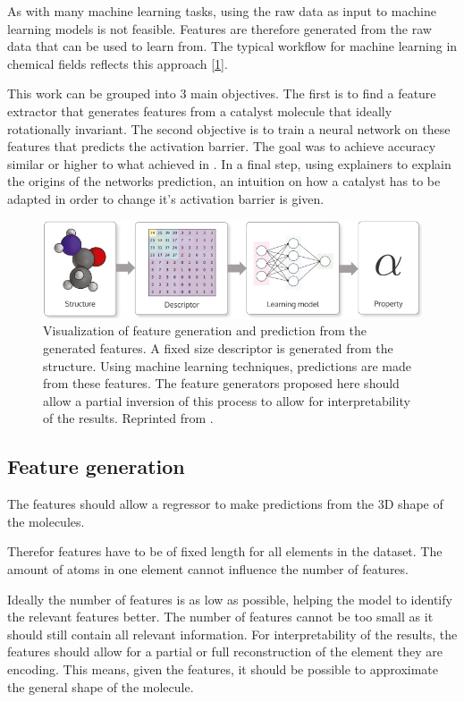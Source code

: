 As with many machine learning tasks, using the raw data as input to machine learning models is not feasible.
Features are therefore generated from the raw data that can be used to learn from.
The typical workflow for machine learning in chemical fields reflects this approach [\ref{fig:feature-process}].

This work can be grouped into 3 main objectives. 
The first is to find a feature extractor that generates features from a catalyst molecule that ideally rotationally invariant.
The second objective is to train a neural network on these features that predicts the activation barrier.
The goal was to achieve accuracy similar or higher to what \citeauthor{friederich_dos} achieved in \cite{friederich_dos}.
In a final step, using explainers to explain the origins of the networks prediction, an intuition on how a catalyst has 
to be adapted in order to change it's activation barrier is given.


\begin{figure}
  \centering
  \includegraphics[width=12cm]{figures/introduction/chem-descriptor.jpg}
  \caption[Machine learning in chemistry]{Visualization of feature generation and prediction from the generated features. 
  A fixed size descriptor is generated from the structure. Using machine learning techniques, 
  predictions are made from these features.
  The feature generators proposed here should allow a partial inversion of this process to allow for interpretability of the results.
  Reprinted from \cite{dscribe}.}
  \label{fig:feature-process}
\end{figure}


\subsection{Feature generation}

The features should allow a regressor to make predictions from the 3D shape of the molecules.

Therefor features have to be of fixed length for all elements in the dataset.
The amount of atoms in one element cannot influence the number of features.

Ideally the number of features is as low as possible, helping the model to identify the relevant features better.
The number of features cannot be too small as it should still contain all relevant information.
For interpretability of the results, the features should allow for a partial or full reconstruction of the element they are encoding.
This means, given the features, it should be possible to approximate the general shape of the molecule.

